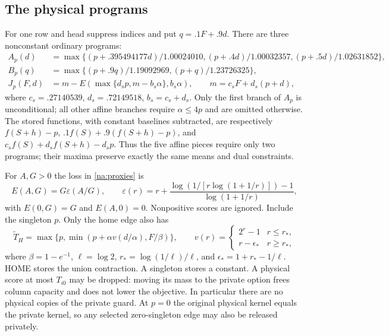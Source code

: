 \subsection{The physical programs}

For one row and head suppress indices and put $q=.1F+.9d$. There are
three nonconstant ordinary programs:
\begin{equation}\label{na:proxies}
 \begin{split}
 A_p(d)&=\max\{(p+.395494177d)/1.00024010,
                   (p+.4d)/1.00032357,(p+.5d)/1.02631852\},\\
 B_p(q)&=\max\{(p+.9q)/1.19092969,(p+q)/1.23726325\},\\
 J_p(F,d)&=m-E(\max\{d_sp,m-b_s\alpha\},b_s\alpha),\qquad
 m=c_sF+d_s(p+d),
 \end{split}
\end{equation}
where $c_s=.27140539$, $d_s=.72149518$, $b_s=c_s+d_s$.
Only the first branch of $A_p$ is unconditional; all other affine
branches require $\alpha\le4p$ and are omitted otherwise. The stored
functions, with constant baselines subtracted, are respectively
$f(S+h)-p$, $.1f(S)+.9(f(S+h)-p)$, and
$c_sf(S)+d_sf(S+h)-d_sp$. Thus the five affine pieces require only two
programs; their maxima preserve exactly the same means and dual constraints.

For $A,G>0$ the loss in \eqref{na:proxies} is
\begin{equation}\label{na:loss}
 E(A,G)=G\varepsilon(A/G),\qquad
 \varepsilon(r)=r+\frac{\log(1/[r\log(1+1/r)])-1}{\log(1+1/r)},
\end{equation}
with $E(0,G)=G$ and $E(A,0)=0$. Nonpositive scores are ignored.
Include the singleton $p$. Only the home edge also has
\begin{equation}\label{na:home-score}
 \widetilde T_H=\max\{p,\min(p+\alpha v(d/\alpha),F/\beta)\},\qquad
 v(r)=\begin{cases}2^r-1&r\le r_*,\\r-\epsilon_*&r\ge r_*,\end{cases}
\end{equation}
where $\beta=1-e^{-1}$, $\ell=\log2$,
$r_*=\log(1/\ell)/\ell$, and $\epsilon_*=1+r_*-1/\ell$.
HOME stores the union contraction. A singleton stores a constant.
A physical score at most $T_{i0}$ may be dropped: moving its mass to the
private option frees column capacity and does not lower the objective.
In particular there are no physical copies of the private guard.
At $p=0$ the original physical kernel equals the private kernel, so any selected
zero-singleton edge may also be released privately.

